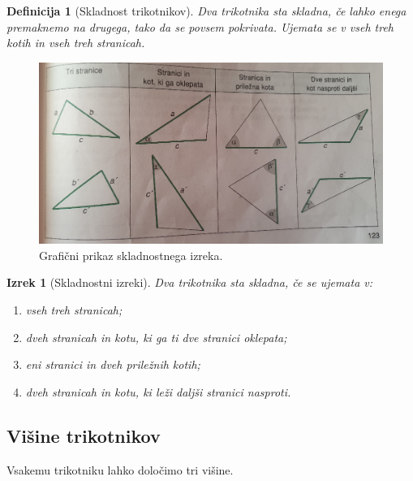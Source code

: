 \documentclass{article}
\newtheorem{definicija}{Definicija}[subsection]
\newtheorem{izrek}{Izrek}[subsection]
\begin{document}
\begin{definicija}[Skladnost trikotnikov]
    Dva trikotnika sta skladna, če lahko enega premaknemo na drugega, tako da se povsem pokrivata. Ujemata se v vseh treh kotih in vseh treh stranicah.
\end{definicija}

\begin{figure}[h]
    \includegraphics[width=0.8\linewidth]{skladnostniIzrek.png}
    \centering
    \caption{Grafični prikaz skladnostnega izreka.}
\end{figure}

\begin{izrek}[Skladnostni izreki]
    Dva trikotnika sta skladna, če se ujemata v:
    \begin{enumerate}
        \item vseh treh stranicah;
        \item dveh stranicah in kotu, ki ga ti dve stranici oklepata;
        \item eni stranici in dveh priležnih kotih;
        \item dveh stranicah in kotu, ki leži daljši stranici nasproti.
    \end{enumerate}
\end{izrek}


\pagebreak
\subsection{ Višine trikotnikov }

Vsakemu trikotniku lahko določimo tri višine.
\end{document}
